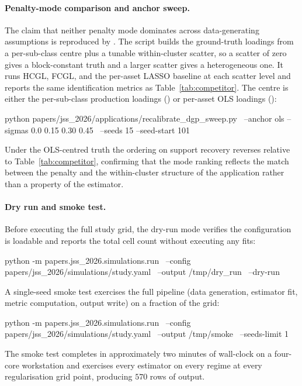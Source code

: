 \documentclass[article]{jss}
\begin{document}
\begin{appendix}
\paragraph{Penalty-mode comparison and anchor sweep.}
The claim that neither penalty mode dominates across data-generating
assumptions is reproduced by . The
script builds the ground-truth loadings from a per-sub-class centre
plus a tunable within-cluster scatter, so a scatter of zero gives a
block-constant truth and a larger scatter gives a heterogeneous one. It
runs HCGL, FCGL, and the per-asset LASSO baseline at each scatter level
and reports the same identification metrics as
Table~\ref{tab:competitor}. The centre is either the per-sub-class
production loadings () or per-asset OLS loadings
():
%
\begin{CodeChunk}
	\begin{CodeInput}
python papers/jss_2026/applications/recalibrate_dgp_sweep.py \
--anchor ols --sigmas 0.0 0.15 0.30 0.45 \
--seeds 15 --seed-start 101
	\end{CodeInput}
\end{CodeChunk}
%
Under the OLS-centred truth the ordering on support recovery reverses
relative to Table~\ref{tab:competitor}, confirming that the mode
ranking reflects the match between the penalty and the within-cluster
structure of the application rather than a property of the estimator.

\paragraph{Dry run and smoke test.}
Before executing the full study grid, the dry-run mode verifies the
configuration is loadable and reports the total cell count without
executing any fits:
%
\begin{CodeChunk}
	\begin{CodeInput}
python -m papers.jss_2026.simulations.run \
--config papers/jss_2026/simulations/study.yaml \
--output /tmp/dry_run \
--dry-run
	\end{CodeInput}
\end{CodeChunk}
%
A single-seed smoke test exercises the full pipeline (data
generation, estimator fit, metric computation, output write) on a
fraction of the grid:
%
\begin{CodeChunk}
	\begin{CodeInput}
python -m papers.jss_2026.simulations.run \
--config papers/jss_2026/simulations/study.yaml \
--output /tmp/smoke \
--seeds-limit 1
	\end{CodeInput}
\end{CodeChunk}
%
The smoke test completes in approximately two minutes of wall-clock
on a four-core workstation and exercises every estimator on every
regime at every regularisation grid point, producing $570$ rows of
output.


\end{appendix}
\end{document}
